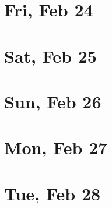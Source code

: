 	\section{Fri, Feb 24}
		
	\section{Sat, Feb 25}
		
	\section{Sun, Feb 26}
		
	\section{Mon, Feb 27}
		
	\section{Tue, Feb 28}
		
